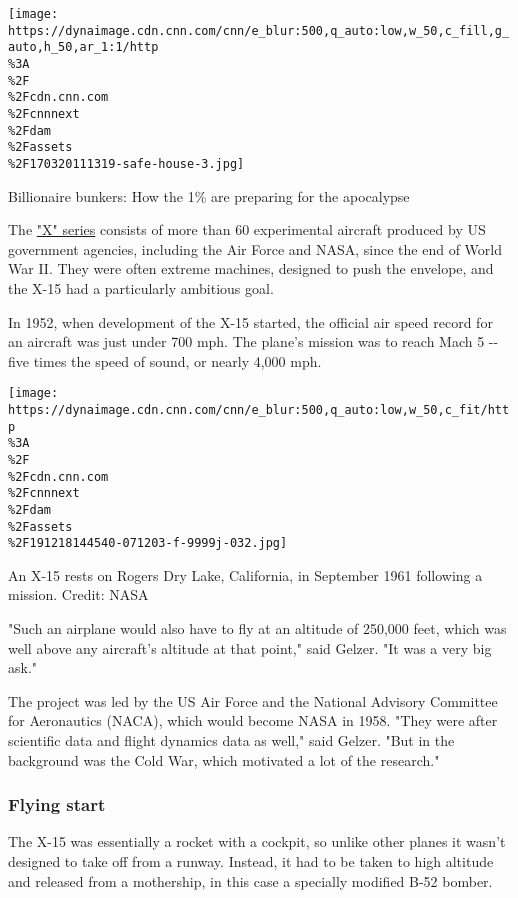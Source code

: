 \href{/style/article/doomsday-luxury-bunkers/index.html}{}

\texttt{[image: https://dynaimage.cdn.cnn.com/cnn/e\_blur:500,q\_auto:low,w\_50,c\_fill,g\_auto,h\_50,ar\_1:1/http\\\%3A\\\%2F\\\%2Fcdn.cnn.com\\\%2Fcnnnext\\\%2Fdam\\\%2Fassets\\\%2F170320111319-safe-house-3.jpg]}

Billionaire bunkers: How the 1\% are preparing for the apocalypse

The
\href{https://www.nasa.gov/centers/armstrong/images/X-Planes/index.html}{"X"
series} consists of more than 60 experimental aircraft produced by US
government agencies, including the Air Force and NASA, since the end of
World War II. They were often extreme machines, designed to push the
envelope, and the X-15 had a particularly ambitious goal.

In 1952, when development of the X-15 started, the official air speed
record for an aircraft was just under 700 mph. The plane's mission was
to reach Mach 5 -\/- five times the speed of sound, or nearly 4,000 mph.

\texttt{[image: https://dynaimage.cdn.cnn.com/cnn/e\_blur:500,q\_auto:low,w\_50,c\_fit/http\\\%3A\\\%2F\\\%2Fcdn.cnn.com\\\%2Fcnnnext\\\%2Fdam\\\%2Fassets\\\%2F191218144540-071203-f-9999j-032.jpg]}

An X-15 rests on Rogers Dry Lake, California, in September 1961
following a mission. Credit: NASA

"Such an airplane would also have to fly at an altitude of 250,000 feet,
which was well above any aircraft's altitude at that point," said
Gelzer. "It was a very big ask."

The project was led by the US Air Force and the National Advisory
Committee for Aeronautics (NACA), which would become NASA in 1958. "They
were after scientific data and flight dynamics data as well," said
Gelzer. "But in the background was the Cold War, which motivated a lot
of the research."

\hypertarget{flying-start}{%
\subsubsection{Flying start}\label{flying-start}}

The X-15 was essentially a rocket with a cockpit, so unlike other planes
it wasn't designed to take off from a runway. Instead, it had to be
taken to high altitude and released from a mothership, in this case a
specially modified B-52 bomber.

\href{/style/article/grumman-x-29-nasa-darpa-fighter-plane/index.html}{}

